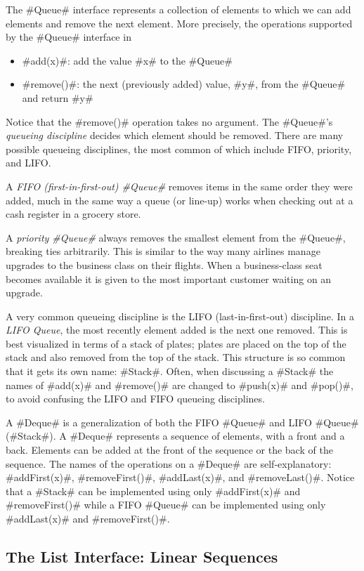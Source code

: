 The #Queue# interface represents a collection of elements to which we
can add elements and remove the next element.  More precisely, the operations
supported by the #Queue# interface in
\begin{itemize}
  \item #add(x)#: add the value #x# to the #Queue#
  \item #remove()#: the next (previously added) value, #y#, from the #Queue# and return #y#
\end{itemize}
Notice that the #remove()# operation takes no argument.  The #Queue#'s
\emph{queueing discipline} decides which element should be removed.
There are many possible queueing disciplines, the most common of which
include FIFO, priority, and LIFO.

A \emph{FIFO (first-in-first-out) #Queue#} removes items in the same
order they were added, much in the same way a queue (or line-up) works
when checking out at a cash register in a grocery store.

A \emph{priority #Queue#} always removes the smallest element from
the #Queue#, breaking ties arbitrarily.  This is similar to the way
many airlines manage upgrades to the business class on their flights.
When a business-class seat becomes available it is given to the most
important customer waiting on an upgrade.

A very common queueing discipline is the LIFO (last-in-first-out)
discipline.  In a \emph{LIFO Queue}, the most recently element added is the
next one removed.  This is best visualized in terms of a stack of plates;
plates are placed on the top of the stack and also removed from the top
of the stack. This structure is so common that it gets its own name: #Stack#.
Often, when discussing a #Stack# the names of #add(x)# and #remove()#
are changed to #push(x)# and #pop()#, to avoid confusing the LIFO and
FIFO queueing disciplines.

A #Deque# is a generalization of both the FIFO #Queue# and LIFO #Queue#
(#Stack#).   A #Deque# represents a sequence of elements, with a front
and a back.  Elements can be added at the front of the sequence or
the back of the sequence.  The names of the operations on a #Deque#
are self-explanatory: #addFirst(x)#, #removeFirst()#, #addLast(x)#,
and #removeLast()#.  Notice that a #Stack# can be implemented using only
#addFirst(x)# and #removeFirst()# while a FIFO #Queue# can be implemented
using only #addLast(x)# and #removeFirst()#.


\subsection{The List Interface: Linear Sequences}

